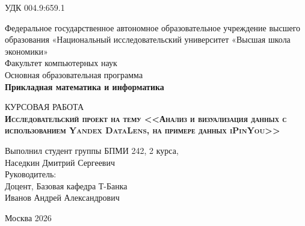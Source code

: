 \begin{titlepage}
\newpage
\raggedleft
    УДК 004.9:659.1
{
\begin{center}
Федеральное государственное автономное образовательное учреждение высшего образования «Национальный исследовательский университет «Высшая школа экономики»
\\
\bigskip
Факультет компьютерных наук \\
Основная образовательная программа \\
\textbf{Прикладная математика и информатика \\}
\end{center}
}

\vspace{8em}

\begin{center}
{\Large КУРСОВАЯ РАБОТА}\\
\textsc{\textbf{
Исследовательский проект на тему
\linebreak
<<Анализ и визуализация данных с использованием Yandex DataLens, на примере данных iPinYou>>}}
\end{center}

\vspace{2em}
    
    {
    \hfill\parbox{16cm}{
    \hspace*{5cm}\hspace*{-5cm}Выполнил студент группы БПМИ 242, 2 курса,\\
     Наседкин Дмитрий Сергеевич\\
     
    \hspace*{5cm}\hspace*{-5cm}Руководитель:\\
    Доцент, Базовая кафедра Т-Банка \\
    Иванов Андрей Александрович}}
    
\vspace{\fill}


\begin{center}
Москва 2026
\end{center}

\end{titlepage}